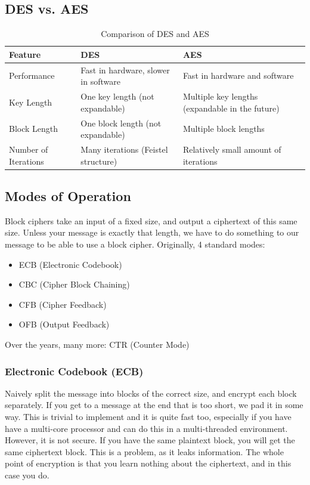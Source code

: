 \subsection{DES vs. AES}
\begin{table}[h!]
    \centering
    \begin{tabular}{|>{\raggedright\arraybackslash}m{4cm}|>{\raggedright\arraybackslash}m{6cm}|>{\raggedright\arraybackslash}m{6cm}|}
    \hline
    \textbf{Feature} & \textbf{DES} & \textbf{AES} \\
    \hline
    Performance & Fast in hardware, slower in software & Fast in hardware and software \\
    \hline
    Key Length & One key length (not expandable) & Multiple key lengths (expandable in the future) \\
    \hline
    Block Length & One block length (not expandable) & Multiple block lengths \\
    \hline
    Number of Iterations & Many iterations (Feistel structure) & Relatively small amount of iterations \\
    \hline
    \end{tabular}
    \caption{Comparison of DES and AES}
\end{table}

\subsection{Modes of Operation}
Block ciphers take an input of a fixed size, and output a ciphertext of this same size. Unless your message is exactly that length, we have to do something to our message to be able to use a block cipher. Originally, 4 standard modes:
\begin{itemize}
    \item ECB (Electronic Codebook)
    \item CBC (Cipher Block Chaining)
    \item CFB (Cipher Feedback)
    \item OFB (Output Feedback)
\end{itemize}

Over the years, many more: CTR (Counter Mode)

\subsubsection{Electronic Codebook (ECB)}
Naively split the message into blocks of the correct size, and encrypt each block separately. If you get to a message at the end that is too short, we pad it in some way. This is trivial to implement and it is quite fast too, especially if you have have a multi-core processor and can do this in a multi-threaded environment. However, it is not secure. If you have the same plaintext block, you will get the same ciphertext block. This is a problem, as it leaks information. The whole point of encryption is that you learn nothing about the ciphertext, and in this case you do.

